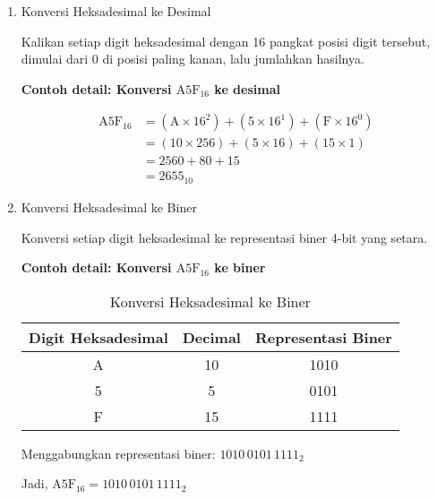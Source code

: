 \documentclass[../main.tex]{subfiles}
\begin{document}
\begin{enumerate}
                \item{Konversi Heksadesimal ke Desimal}

                    Kalikan setiap digit heksadesimal dengan 16 pangkat posisi digit tersebut, dimulai dari 0 di posisi paling kanan, lalu jumlahkan hasilnya.

                    \textbf{Contoh detail: Konversi \(\mathrm{A5F}_{16}\) ke desimal}

                    \begin{align*}
                    \mathrm{A5F}_{16} &= (\mathrm{A} \times 16^2) + (5 \times 16^1) + (\mathrm{F} \times 16^0) \\
                    &= (10 \times 256) + (5 \times 16) + (15 \times 1) \\
                    &= 2560 + 80 + 15 \\
                    &= 2655_{10}
                    \end{align*}

                \item{Konversi Heksadesimal ke Biner}

                    Konversi setiap digit heksadesimal ke representasi biner 4-bit yang setara.

                    \textbf{Contoh detail: Konversi \(\mathrm{A5F}_{16}\) ke biner}

                    \begin{table}[H]
                        \centering
                        \caption{Konversi Heksadesimal ke Biner}
                        \begin{tabular}{|c|c|c|}
                            \hline
                            \textbf{Digit Heksadesimal} & \textbf{Decimal} & \textbf{Representasi Biner} \\
                            \hline
                            A & 10 & 1010 \\
                            5 & 5 & 0101 \\
                            F & 15 & 1111 \\
                            \hline
                        \end{tabular}
                        \label{tab:hex-to-binary}
                    \end{table}

                    Menggabungkan representasi biner: \(1010\,0101\,1111_2\)

                    Jadi, \(\mathrm{A5F}_{16} = 1010\,0101\,1111_2\)


\end{enumerate}
\end{document}
